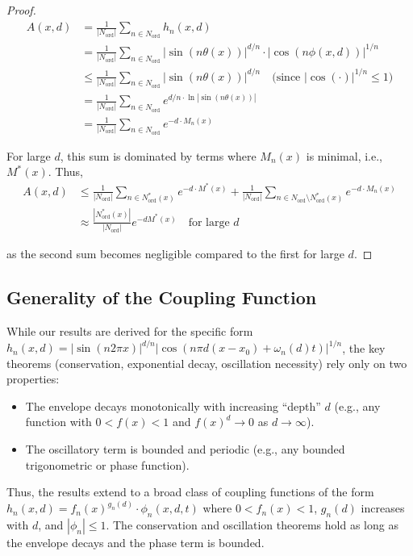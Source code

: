 \documentclass[11pt,a4paper]{article}
\begin{document}
\begin{proof}
\begin{align}
A(x,d) &= \frac{1}{|N_{\text{ord}}|} \sum_{n \in N_{\text{ord}}} h_n(x,d) \\
&= \frac{1}{|N_{\text{ord}}|} \sum_{n \in N_{\text{ord}}} |\sin(n\theta(x))|^{d/n} \cdot |\cos(n\phi(x,d))|^{1/n} \\
&\leq \frac{1}{|N_{\text{ord}}|} \sum_{n \in N_{\text{ord}}} |\sin(n\theta(x))|^{d/n} \quad \text{(since $|\cos(\cdot)|^{1/n} \leq 1$)} \\
&= \frac{1}{|N_{\text{ord}}|} \sum_{n \in N_{\text{ord}}} e^{d/n \cdot \ln|\sin(n\theta(x))|} \\
&= \frac{1}{|N_{\text{ord}}|} \sum_{n \in N_{\text{ord}}} e^{-d \cdot M_n(x)}
\end{align}

For large $d$, this sum is dominated by terms where $M_n(x)$ is minimal, i.e., $M^*(x)$. Thus,
\begin{align}
A(x,d) &\leq \frac{1}{|N_{\text{ord}}|} \sum_{n \in N_{\text{ord}}^*(x)} e^{-d \cdot M^*(x)} + \frac{1}{|N_{\text{ord}}|} \sum_{n \in N_{\text{ord}} \setminus N_{\text{ord}}^*(x)} e^{-d \cdot M_n(x)} \\
&\approx \frac{|N_{\text{ord}}^*(x)|}{|N_{\text{ord}}|} e^{-d M^*(x)} \quad \text{for large $d$}
\end{align}

as the second sum becomes negligible compared to the first for large $d$.
\end{proof}

\subsection{Generality of the Coupling Function}
While our results are derived for the specific form
$ h_n(x,d) = |\sin(n2\pi x)|^{d/n} |\cos(n\pi d(x-x_0) + \omega_n(d)t)|^{1/n} $,
the key theorems (conservation, exponential decay, oscillation necessity) rely only on two properties:
\begin{itemize}
    \item The envelope decays monotonically with increasing ``depth'' $ d $ (e.g., any function with $ 0 < f(x) < 1 $ and $ f(x)^d \to 0 $ as $ d \to \infty $).
    \item The oscillatory term is bounded and periodic (e.g., any bounded trigonometric or phase function).
\end{itemize}
Thus, the results extend to a broad class of coupling functions of the form
$ h_n(x,d) = f_n(x)^{g_n(d)} \cdot \phi_n(x,d,t) $
where $ 0 < f_n(x) < 1 $, $ g_n(d) $ increases with $ d $, and $ |\phi_n| \leq 1 $.
The conservation and oscillation theorems hold as long as the envelope decays and the phase term is bounded.
\end{document}
